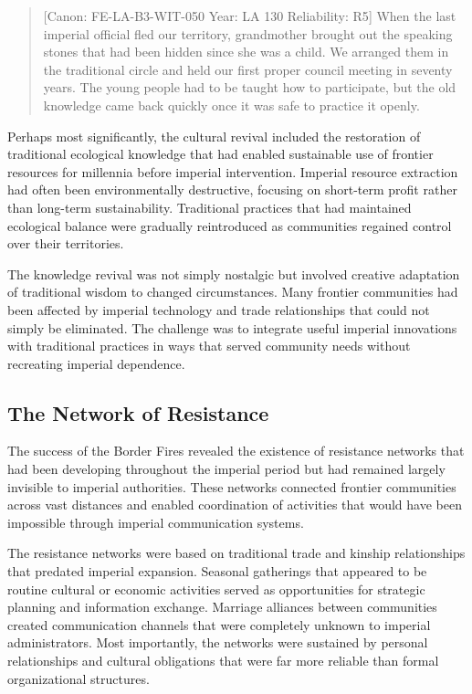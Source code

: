 \begin{quote}
{[}Canon: FE-LA-B3-WIT-050 \textbar{} Year: LA 130 \textbar{}
Reliability: R5{]} When the last imperial official fled our territory,
grandmother brought out the speaking stones that had been hidden since
she was a child. We arranged them in the traditional circle and held our
first proper council meeting in seventy years. The young people had to
be taught how to participate, but the old knowledge came back quickly
once it was safe to practice it openly.
\end{quote}

Perhaps most significantly, the cultural revival included the
restoration of traditional ecological knowledge that had enabled
sustainable use of frontier resources for millennia before imperial
intervention. Imperial resource extraction had often been
environmentally destructive, focusing on short-term profit rather than
long-term sustainability. Traditional practices that had maintained
ecological balance were gradually reintroduced as communities regained
control over their territories.

The knowledge revival was not simply nostalgic but involved creative
adaptation of traditional wisdom to changed circumstances. Many frontier
communities had been affected by imperial technology and trade
relationships that could not simply be eliminated. The challenge was to
integrate useful imperial innovations with traditional practices in ways
that served community needs without recreating imperial dependence.

\subsection{The Network of Resistance}\label{the-network-of-resistance}

The success of the Border Fires revealed the existence of resistance
networks that had been developing throughout the imperial period but had
remained largely invisible to imperial authorities. These networks
connected frontier communities across vast distances and enabled
coordination of activities that would have been impossible through
imperial communication systems.

The resistance networks were based on traditional trade and kinship
relationships that predated imperial expansion. Seasonal gatherings that
appeared to be routine cultural or economic activities served as
opportunities for strategic planning and information exchange. Marriage
alliances between communities created communication channels that were
completely unknown to imperial administrators. Most importantly, the
networks were sustained by personal relationships and cultural
obligations that were far more reliable than formal organizational
structures.

